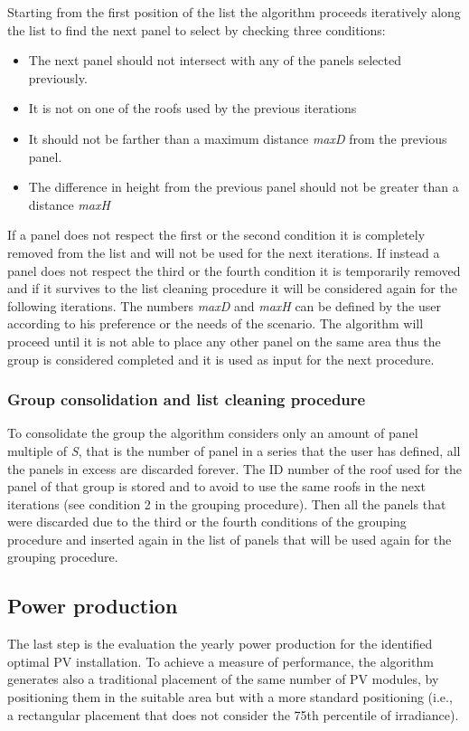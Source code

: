 Starting from the first position of the list the algorithm proceeds iteratively along the list to find the next panel to select by checking three conditions:
\begin{itemize}
    \item The next panel should not intersect with any of the panels selected previously.
    \item It is not on one of the roofs used by the previous iterations
    \item It should not be farther than a maximum distance \emph{maxD} from the previous panel.
    \item The difference in height from the previous panel should not be greater than a distance \emph{maxH}
\end{itemize}
If a panel does not respect the first or the second condition it is completely removed from the list and will not be used for the next iterations. If instead a panel does not respect the third or the fourth condition it is temporarily removed and if it survives to the list cleaning procedure it will be considered again for the following iterations.
The numbers \emph{maxD} and \emph{maxH} can be defined by the user according to his preference or the needs of the scenario. The algorithm will proceed until it is not able to place any other panel on the same area thus the group is considered completed and it is used as input for the next procedure.
\subsubsection{Group consolidation and list cleaning procedure}
To consolidate the group the algorithm considers only an amount of panel multiple of \emph{S}, that is the number of panel in a series that the user has defined, all the panels in excess are discarded forever.
The ID number of the roof used for the panel of that group is stored and to avoid to use the same roofs in the next iterations (see condition 2 in the grouping procedure).
Then all the panels that were discarded due to the third or the fourth conditions of the grouping procedure and inserted again in the list of panels that will be used again for the grouping procedure.

\subsection{Power production}
The last step is the evaluation the yearly power production for the identified optimal PV installation. To achieve a measure of performance, the algorithm generates also a traditional placement of the same number of PV modules, by positioning them in the suitable area but with a more standard positioning (i.e., a  rectangular placement that does not consider the 75th percentile of irradiance). %

